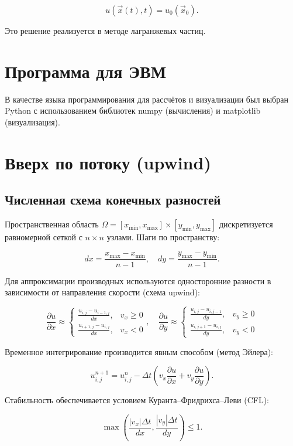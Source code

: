 \begin{equation}
	u(\vec{x}(t), t) = u_0(\vec{x}_0).
	\label{eq:solution_along_characteristics}
\end{equation}

Это решение реализуется в методе лагранжевых частиц.
\section{Программа для ЭВМ}
В качестве языка программирования для рассчётов и
визуализации был выбран Python с использованием библиотек numpy
(вычисления) и matplotlib (визуализация).
\section{Вверх по потоку (upwind)}
\subsection{Численная схема конечных разностей}

Пространственная область \(\Omega = [x_{\min}, x_{\max}] \times [y_{\min}, y_{\max}]\) дискретизуется равномерной сеткой с \(n \times n\) узлами. Шаги по пространству:

\[
dx = \frac{x_{\max} - x_{\min}}{n - 1}, \quad dy = \frac{y_{\max} - y_{\min}}{n - 1}.
\]

Для аппроксимации производных используются односторонние разности в зависимости от направления скорости (схема upwind):

\[
\frac{\partial u}{\partial x} \approx
\begin{cases}
	\frac{u_{i,j} - u_{i-1,j}}{dx}, & v_x \geq 0 \\
	\frac{u_{i+1,j} - u_{i,j}}{dx}, & v_x < 0
\end{cases}, \quad
\frac{\partial u}{\partial y} \approx
\begin{cases}
	\frac{u_{i,j} - u_{i,j-1}}{dy}, & v_y \geq 0 \\
	\frac{u_{i,j+1} - u_{i,j}}{dy}, & v_y < 0
\end{cases}
\]

Временное интегрирование производится явным способом (метод Эйлера):

\[
u_{i,j}^{n+1} = u_{i,j}^{n} - \Delta t \left( v_x \frac{\partial u}{\partial x} + v_y \frac{\partial u}{\partial y} \right).
\]

Стабильность обеспечивается условием Куранта–Фридрихса–Леви (CFL):

\begin{equation}
	\max \left( \frac{|v_x| \Delta t}{dx}, \frac{|v_y| \Delta t}{dy} \right) \leq 1.
	\label{eq:cfl_condition}
\end{equation}

